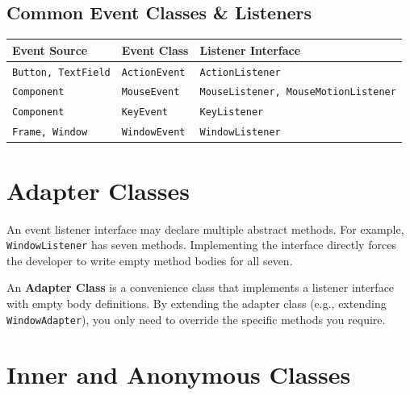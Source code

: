 \documentclass[12pt,a4paper]{article}
\renewcommand{\arraystretch}{1.45}
\begin{document}
\subsection{Common Event Classes \& Listeners}
\par\noindent
{\renewcommand{\arraystretch}{1.45}%
\begin{tabularx}{\linewidth}{|B{3.2cm}|B{4.5cm}|Y|}
\hline
\textbf{Event Source} & \textbf{Event Class} & \textbf{Listener Interface} \\
\hline
\texttt{Button, TextField} & \texttt{ActionEvent} & \texttt{ActionListener} \\
\hline
\texttt{Component} & \texttt{MouseEvent} & \texttt{MouseListener, MouseMotionListener} \\
\hline
\texttt{Component} & \texttt{KeyEvent} & \texttt{KeyListener} \\
\hline
\texttt{Frame, Window} & \texttt{WindowEvent} & \texttt{WindowListener} \\
\hline
\end{tabularx}}

\section{Adapter Classes}

An event listener interface may declare multiple abstract methods. For example, \texttt{WindowListener} has seven methods. Implementing the interface directly forces the developer to write empty method bodies for all seven.

\begin{tcolorbox}[defbox, title={\textbf{Adapter Class Pattern}}]
An \textbf{Adapter Class} is a convenience class that implements a listener interface with empty body definitions. By extending the adapter class (e.g., extending \texttt{WindowAdapter}), you only need to override the specific methods you require.
\end{tcolorbox}

\section{Inner and Anonymous Classes}
\end{document}
